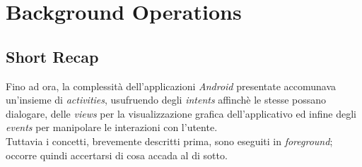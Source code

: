 \documentclass{article}
\begin{document}
\pagestyle{empty}

\section*{Background Operations}
\large

\subsection*{Short Recap}
Fino ad ora, la complessità dell'applicazioni \textit{Android} presentate accomunava un'insieme di \textit{activities}, usufruendo degli \textit{intents} affinchè le stesse possano dialogare, delle \textit{views} per la visualizzazione grafica dell'applicativo ed infine degli \textit{events} per manipolare le interazioni con l'utente.\vspace*{7pt}\\
Tuttavia i concetti, brevemente descritti prima, sono eseguiti in \textit{foreground}; occorre quindi accertarsi di cosa accada al di sotto.     
\end{document}
